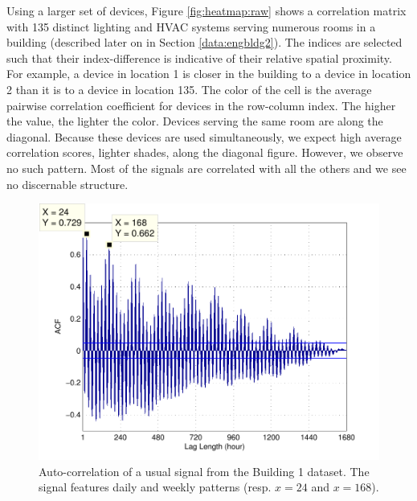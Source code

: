 Using a larger set of devices, Figure \ref{fig:heatmap:raw} shows a correlation matrix with 135 distinct lighting and HVAC systems serving numerous rooms in a building (described later on in Section \ref{data:engbldg2}).
The indices are selected such that their index-difference is indicative of their relative spatial proximity.  
For example, a device in location 1 is closer in the building to a device in location 2 than it is to 
a device in location 135. 
The color of the cell is the average pairwise correlation coefficient for devices in the row-column index.  The higher the value, the lighter the color.
Devices serving the same room are along the diagonal.  Because these devices are used simultaneously, we expect
high average correlation scores, lighter shades, along the diagonal figure.
However, we observe no such pattern.  %
Most of the signals are correlated with all the others and we see no discernable structure.

\begin{figure}[t!]
\begin{center}
\includegraphics[width=.5\textwidth]{img/acf_101A1_GHP-eps-converted-to.pdf}
\caption{Auto-correlation of a usual signal from the Building 1 dataset.
The signal features daily and weekly patterns (resp. $x=24$ and $x=168$).}
\label{fig:autocorr}
\end{center}
\end{figure}

